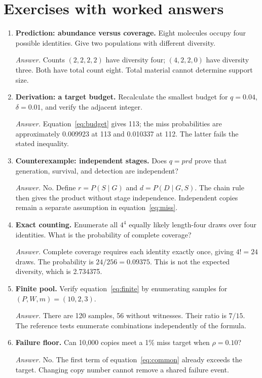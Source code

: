 \section{Exercises with worked answers}

\begin{enumerate}
\item \textbf{Prediction: abundance versus coverage.} Eight molecules occupy four possible identities. Give two populations with different diversity.\par
\textit{Answer.} Counts $(2,2,2,2)$ have diversity four; $(4,2,2,0)$ have diversity three. Both have total count eight. Total material cannot determine support size.

\item \textbf{Derivation: a target budget.} Recalculate the smallest budget for $q=0.04$, $\delta=0.01$, and verify the adjacent integer.\par
\textit{Answer.} Equation~\ref{eq:budget} gives 113; the miss probabilities are approximately 0.009923 at 113 and 0.010337 at 112. The latter fails the stated inequality.

\item \textbf{Counterexample: independent stages.} Does $q=prd$ prove that generation, survival, and detection are independent?\par
\textit{Answer.} No. Define $r=P(S\mid G)$ and $d=P(D\mid G,S)$. The chain rule then gives the product without stage independence. Independent copies remain a separate assumption in equation~\ref{eq:miss}.

\item \textbf{Exact counting.} Enumerate all $4^4$ equally likely length-four draws over four identities. What is the probability of complete coverage?\par
\textit{Answer.} Complete coverage requires each identity exactly once, giving $4!=24$ draws. The probability is $24/256=0.09375$. This is not the expected diversity, which is 2.734375.

\item \textbf{Finite pool.} Verify equation~\ref{eq:finite} by enumerating samples for $(P,W,m)=(10,2,3)$.\par
\textit{Answer.} There are 120 samples, 56 without witnesses. Their ratio is $7/15$. The reference tests enumerate combinations independently of the formula.

\item \textbf{Failure floor.} Can 10,000 copies meet a 1\% miss target when $\rho=0.10$?\par
\textit{Answer.} No. The first term of equation~\ref{eq:common} already exceeds the target. Changing copy number cannot remove a shared failure event.


\end{enumerate}
